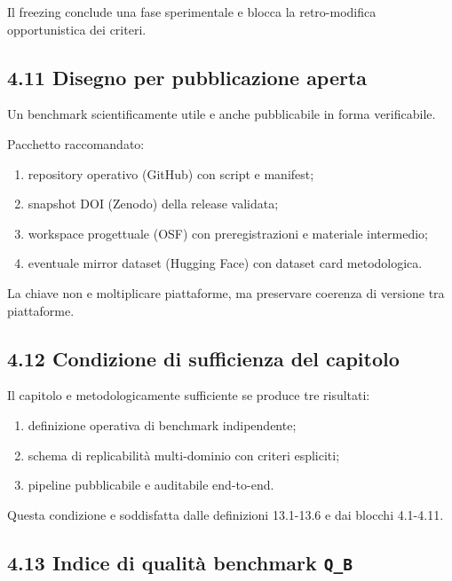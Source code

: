 Il freezing conclude una fase sperimentale e blocca la retro-modifica opportunistica dei criteri.

\subsection{4.11 Disegno per pubblicazione aperta}

Un benchmark scientificamente utile e anche pubblicabile in forma verificabile.

Pacchetto raccomandato:

\begin{enumerate}
\def\labelenumi{\arabic{enumi}.}
\tightlist
\item
  repository operativo (GitHub) con script e manifest;
\item
  snapshot DOI (Zenodo) della release validata;
\item
  workspace progettuale (OSF) con preregistrazioni e materiale intermedio;
\item
  eventuale mirror dataset (Hugging Face) con dataset card metodologica.
\end{enumerate}

La chiave non e moltiplicare piattaforme, ma preservare coerenza di versione tra piattaforme.

\subsection{4.12 Condizione di sufficienza del capitolo}

Il capitolo e metodologicamente sufficiente se produce tre risultati:

\begin{enumerate}
\def\labelenumi{\arabic{enumi}.}
\tightlist
\item
  definizione operativa di benchmark indipendente;
\item
  schema di replicabilità multi-dominio con criteri espliciti;
\item
  pipeline pubblicabile e auditabile end-to-end.
\end{enumerate}

Questa condizione e soddisfatta dalle definizioni 13.1-13.6 e dai blocchi 4.1-4.11.

\subsection{\texorpdfstring{4.13 Indice di qualità benchmark \texttt{Q\_B}}{4.13 Indice di qualità benchmark Q\_B}}

